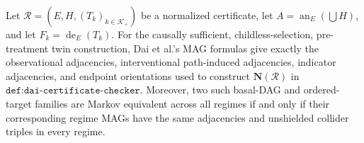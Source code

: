 Let \(\mathcal R=(E,H,(T_k)_{k\in\mathcal K_+})\) be a normalized certificate, let \(A=\operatorname{an}_E(\bigcup H)\), and let \(F_k=\operatorname{de}_E(T_k)\).  For the causally sufficient, childless-selection, pre-treatment twin construction, Dai et al.'s MAG formulas give exactly the observational adjacencies, interventional path-induced adjacencies, indicator adjacencies, and endpoint orientations used to construct \(\mathbf N(\mathcal R)\) in \(\texttt{def:dai-certificate-checker}\).  Moreover, two such basal-DAG and ordered-target families are Markov equivalent across all regimes if and only if their corresponding regime MAGs have the same adjacencies and unshielded collider triples in every regime.